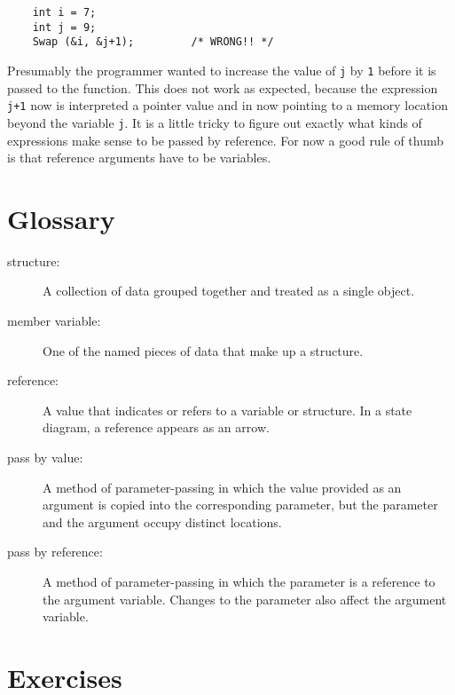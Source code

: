 \begin{verbatim}
	int i = 7;
	int j = 9;
	Swap (&i, &j+1);         /* WRONG!! */
\end{verbatim}
%
Presumably the programmer wanted to increase the value of {\tt j} by {\tt 1}
before it is passed to the function.
This does not work as expected, because the expression {\tt j+1} now
is interpreted a pointer value and in now pointing to a memory
location beyond the variable {\tt j}. 
It is a little tricky to figure out exactly
what kinds of expressions make sense to be passed by reference.  For now
a good rule of thumb is that reference arguments have to be
variables.


\section{Glossary}

\begin{description}
	
	\item[structure:]  A collection of data grouped together and
	treated as a single object.
	
	\item[member variable:]  One of the named pieces of data that make up
	a structure.
	
	\item[reference:]  A value that indicates or refers to a variable
	or structure.  In a state diagram, a reference appears as an arrow.
	
	\item[pass by value:]  A method of parameter-passing in which the
	value provided as an argument is copied into the corresponding
	parameter, but the parameter and the argument occupy distinct
	locations.
	
	\item[pass by reference:]  A method of parameter-passing in which
	the parameter is a reference to the argument variable.  Changes
	to the parameter also affect the argument variable.
	
	
\end{description}

\section{Exercises}
\setcounter{exercisenum}{0}




